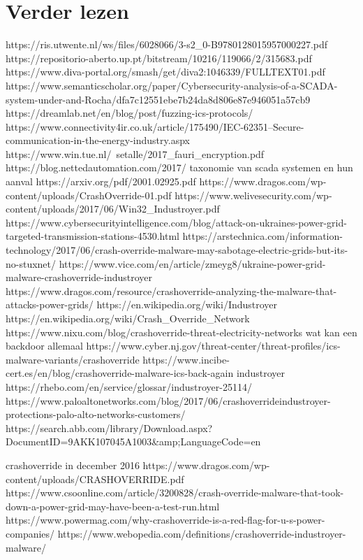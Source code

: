 \documentclass[11pt]{report}
\begin{document}
\section{Verder lezen}

https://ris.utwente.nl/ws/files/6028066/3-s2_0-B9780128015957000227.pdf
https://repositorio-aberto.up.pt/bitstream/10216/119066/2/315683.pdf
https://www.diva-portal.org/smash/get/diva2:1046339/FULLTEXT01.pdf
https://www.semanticscholar.org/paper/Cybersecurity-analysis-of-a-SCADA-system-under-and-Rocha/dfa7c12551ebe7b24da8d806e87e946051a57cb9
https://dreamlab.net/en/blog/post/fuzzing-ics-protocols/
https://www.connectivity4ir.co.uk/article/175490/IEC-62351--Secure-communication-in-the-energy-industry.aspx
https://www.win.tue.nl/~setalle/2017_fauri_encryption.pdf
https://blog.nettedautomation.com/2017/
taxonomie van scada systemen en hun aanval
https://arxiv.org/pdf/2001.02925.pdf
https://www.dragos.com/wp-content/uploads/CrashOverride-01.pdf
https://www.welivesecurity.com/wp-content/uploads/2017/06/Win32_Industroyer.pdf
https://www.cybersecurityintelligence.com/blog/attack-on-ukraines-power-grid-targeted-transmission-stations-4530.html
https://arstechnica.com/information-technology/2017/06/crash-override-malware-may-sabotage-electric-grids-but-its-no-stuxnet/
https://www.vice.com/en/article/zmeyg8/ukraine-power-grid-malware-crashoverride-industroyer
https://www.dragos.com/resource/crashoverride-analyzing-the-malware-that-attacks-power-grids/
https://en.wikipedia.org/wiki/Industroyer
https://en.wikipedia.org/wiki/Crash_Override_Network
https://www.nixu.com/blog/crashoverride-threat-electricity-networks
wat kan een backdoor allemaal
https://www.cyber.nj.gov/threat-center/threat-profiles/ics-malware-variants/crashoverride
https://www.incibe-cert.es/en/blog/crashoverride-malware-ics-back-again
industroyer
https://rhebo.com/en/service/glossar/industroyer-25114/
https://www.paloaltonetworks.com/blog/2017/06/crashoverrideindustroyer-protections-palo-alto-networks-customers/
https://search.abb.com/library/Download.aspx?DocumentID=9AKK107045A1003&amp;LanguageCode=en



crashoverride in december 2016
https://www.dragos.com/wp-content/uploads/CRASHOVERRIDE.pdf
https://www.csoonline.com/article/3200828/crash-override-malware-that-took-down-a-power-grid-may-have-been-a-test-run.html
https://www.powermag.com/why-crashoverride-is-a-red-flag-for-u-s-power-companies/
https://www.webopedia.com/definitions/crashoverride-industroyer-malware/
\end{document}
